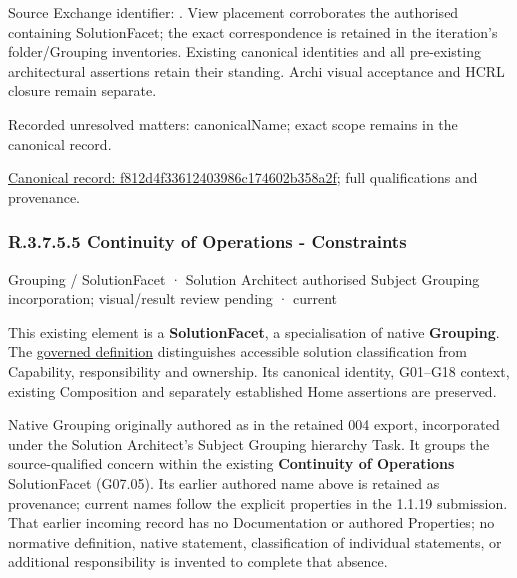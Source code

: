 Source Exchange identifier: \texttt{}. View placement corroborates
the authorised containing SolutionFacet; the exact correspondence is retained in the
iteration's folder/Grouping inventories. Existing canonical identities and all
pre-existing architectural assertions retain their standing. Archi visual
acceptance and HCRL closure remain separate.


{\small Recorded unresolved matters: canonicalName; exact scope remains in the canonical record.}\par
{\footnotesize \href{../../../../../../../continuum/grouping/f812d4f33612403986c174602b358a2f.md}{Canonical record: f812d4f33612403986c174602b358a2f}; full qualifications and provenance.}\par
\subsubsection*{R.3.7.5.5 Continuity of Operations - Constraints}
\label{navigation:R.3.7.5.5}

\label{element:5e78ed0ddec14bb4b081082c66c75ad2}
{\small Grouping / SolutionFacet · Solution Architect authorised Subject Grouping incorporation; visual/result review pending · current}\par

This existing element is a \textbf{SolutionFacet}, a specialisation of native
\textbf{Grouping}. The \href{\detokenize{../../../../../../../governance/continuum-representation.md#solutionfacet-classification--1119-candidate}}{governed definition}
distinguishes accessible solution classification from Capability, responsibility
and ownership. Its canonical identity, G01–G18 context, existing Composition
and separately established Home assertions are preserved.



Native Grouping originally authored as \texttt{} in the retained 004 export,
incorporated under the Solution Architect's Subject Grouping hierarchy Task.
It groups the source-qualified \texttt{} concern within
the existing \textbf{Continuity of Operations} SolutionFacet (G07.05). Its earlier authored name above is retained as provenance; current names
follow the explicit properties in the 1.1.19 submission.
That earlier incoming record has no Documentation or authored Properties; no normative
definition, native statement, classification of individual statements, or
additional responsibility is invented to complete that absence.



